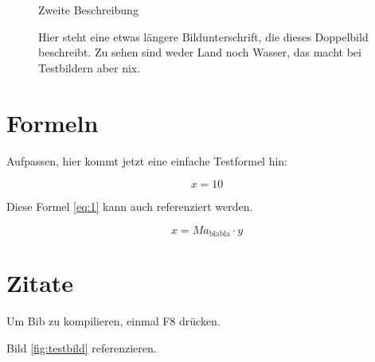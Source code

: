 \documentclass[
12pt, %
toc=listofnumbered, %
toc=chapterentrydotfill, %
numbers=noenddot, %
captions=tableheading, %
bibliography=numbered
]{scrreprt}
\let\Oldsection\section
\renewcommand{\section}{\FloatBarrier\Oldsection}
\begin{document}
\begin{figure}
\begin{minipage}[b]{.4\linewidth}
		\caption{Zweite Beschreibung}
		\label{fig:testbild_klein_rechts}
	\end{minipage}
\caption*{Hier steht eine etwas längere Bildunterschrift, die dieses Doppelbild beschreibt. Zu sehen sind weder Land noch Wasser, das macht bei Testbildern aber nix.}
\end{figure}

\section{Formeln}

Aufpassen, hier kommt jetzt eine einfache Testformel hin:

\begin{equation}
\label{eq:1}
x=10
\end{equation}

Diese Formel \autoref{eq:1} kann auch referenziert werden.

\begin{equation}
x=Ma_{\mathrm{blabla}} \cdot y
\end{equation}

\section{Zitate}

Um Bib zu kompilieren, einmal F8 drücken.

Bild \autoref{fig:testbild} referenzieren.

\printbibliography[title=Literaturverzeichnis]
\end{document}

